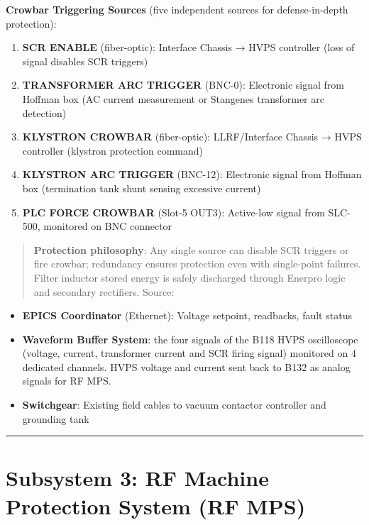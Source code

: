 \textbf{Crowbar Triggering Sources} (five independent sources for defense-in-depth protection):

\begin{enumerate}
\def\labelenumi{\arabic{enumi}.}
\tightlist
\item
  \textbf{SCR ENABLE} (fiber-optic): Interface Chassis → HVPS controller (loss of signal disables SCR triggers)
\item
  \textbf{TRANSFORMER ARC TRIGGER} (BNC-0): Electronic signal from Hoffman box (AC current measurement or Stangenes transformer arc detection)
\item
  \textbf{KLYSTRON CROWBAR} (fiber-optic): LLRF/Interface Chassis → HVPS controller (klystron protection command)
\item
  \textbf{KLYSTRON ARC TRIGGER} (BNC-12): Electronic signal from Hoffman box (termination tank shunt sensing excessive current)
\item
  \textbf{PLC FORCE CROWBAR} (Slot-5 OUT3): Active-low signal from SLC-500, monitored on BNC connector
\end{enumerate}

\begin{quote}
\textbf{Protection philosophy}: Any single source can disable SCR triggers or fire crowbar; redundancy ensures protection even with single-point failures. Filter inductor stored energy is safely discharged through Enerpro logic and secondary rectifiers. Source: 
\end{quote}

\begin{itemize}
\tightlist
\item
  \textbf{EPICS Coordinator} (Ethernet): Voltage setpoint, readbacks, fault status
\item
  \textbf{Waveform Buffer System}: the four signals of the B118 HVPS oscilloscope (voltage, current, transformer current and SCR firing signal) monitored on 4 dedicated channels. HVPS voltage and current sent back to B132 as analog signals for RF MPS.
\item
  \textbf{Switchgear}: Existing field cables to vacuum contactor controller and grounding tank
\end{itemize}

\begin{center}\rule{0.5\linewidth}{0.5pt}\end{center}

\section{Subsystem 3: RF Machine Protection System (RF MPS)}\label{subsystem-3-rf-machine-protection-system-rf-mps}

